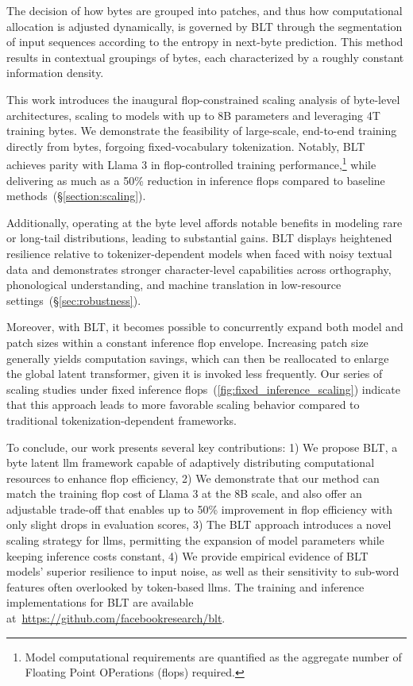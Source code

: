 The decision of how bytes are grouped into patches, and thus how computational allocation is adjusted dynamically, is governed by {\textsc BLT} through the segmentation of input sequences according to the entropy in next-byte prediction. This method results in contextual groupings of bytes, each characterized by a roughly constant information density.

This work introduces the inaugural flop-constrained scaling analysis of byte-level architectures, scaling to models with up to 8B parameters and leveraging 4T training bytes. We demonstrate the feasibility of large-scale, end-to-end training directly from bytes, forgoing fixed-vocabulary tokenization. Notably, {\textsc BLT} achieves parity with Llama 3 in flop-controlled training performance,\footnote{Model computational requirements are quantified as the aggregate number of Floating Point OPerations (flops) required.} while delivering as much as a 50\% reduction in inference flops compared to baseline methods~(\S\ref{section:scaling}). 

Additionally, operating at the byte level affords notable benefits in modeling rare or long-tail distributions, leading to substantial gains. {\textsc BLT} displays heightened resilience relative to tokenizer-dependent models when faced with noisy textual data and demonstrates stronger character-level capabilities across orthography, phonological understanding, and machine translation in low-resource settings~(\S\ref{sec:robustness}). 

Moreover, with {\textsc BLT}, it becomes possible to concurrently expand both model and patch sizes within a constant inference flop envelope. Increasing patch size generally yields computation savings, which can then be reallocated to enlarge the global latent transformer, given it is invoked less frequently. Our series of scaling studies under fixed inference flops~(\autoref{fig:fixed_inference_scaling}) indicate that this approach leads to more favorable scaling behavior compared to traditional tokenization-dependent frameworks.

To conclude, our work presents several key contributions: 1) We propose {\textsc BLT}, a byte latent llm framework capable of adaptively distributing computational resources to enhance flop efficiency, 2) We demonstrate that our method can match the training flop cost of Llama 3 at the 8B scale, and also offer an adjustable trade-off that enables up to 50\% improvement in flop efficiency with only slight drops in evaluation scores, 3) The {\textsc BLT} approach introduces a novel scaling strategy for llms, permitting the expansion of model parameters while keeping inference costs constant, 4) We provide empirical evidence of {\textsc BLT} models’ superior resilience to input noise, as well as their sensitivity to sub-word features often overlooked by token-based llms. The training and inference implementations for {\textsc BLT} are available at~\url{https://github.com/facebookresearch/blt}.

